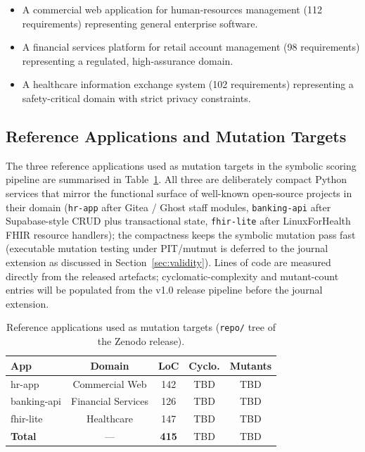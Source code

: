 \documentclass[conference]{IEEEtran}
\begin{document}
\begin{itemize}
\item A commercial web application for human-resources management (112 requirements) representing general enterprise software.
\item A financial services platform for retail account management (98 requirements) representing a regulated, high-assurance domain.
\item A healthcare information exchange system (102 requirements) representing a safety-critical domain with strict privacy constraints.
\end{itemize}

\begin{table}[!t]
\centering
\caption{Dataset summary by domain}
\label{tab:dataset_summary}


\end{table}

\subsection{Reference Applications and Mutation Targets}

The three reference applications used as mutation targets in the symbolic scoring pipeline are summarised in Table~\ref{tab:reference_apps}. All three are deliberately compact Python services that mirror the functional surface of well-known open-source projects in their domain (\texttt{hr-app} after Gitea / Ghost staff modules, \texttt{banking-api} after Supabase-style CRUD plus transactional state, \texttt{fhir-lite} after LinuxForHealth FHIR resource handlers); the compactness keeps the symbolic mutation pass fast (executable mutation testing under PIT/mutmut is deferred to the journal extension as discussed in Section~\ref{sec:validity}). Lines of code are measured directly from the released artefacts; cyclomatic-complexity and mutant-count entries will be populated from the v1.0 release pipeline before the journal extension.

\begin{table}[!t]
\centering
\caption{Reference applications used as mutation targets (\texttt{repo/} tree of the Zenodo release).}
\label{tab:reference_apps}
\begin{tabular}{lcccc}
\hline
\textbf{App} & \textbf{Domain} & \textbf{LoC} & \textbf{Cyclo.} & \textbf{Mutants} \\
\hline
hr-app       & Commercial Web      & 142 & TBD & TBD \\
banking-api  & Financial Services  & 126 & TBD & TBD \\
fhir-lite    & Healthcare          & 147 & TBD & TBD \\
\hline
\textbf{Total} & ---              & \textbf{415} & TBD & TBD \\
\hline
\end{tabular}
\end{table}
\end{document}
